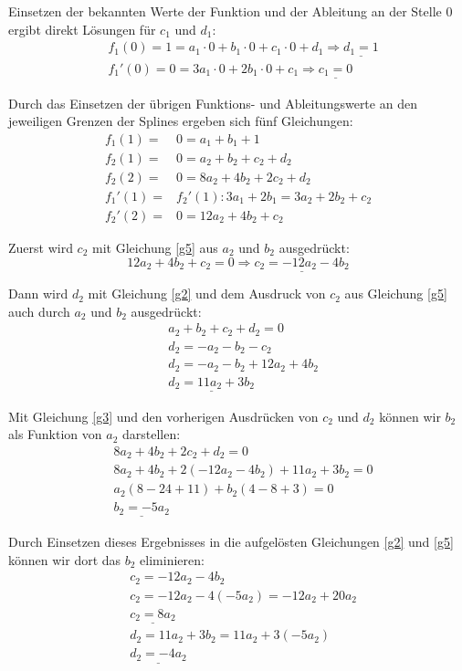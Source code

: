 \documentclass[a4paper,11pt,oneside]{scrartcl}
\begin{document}
Einsetzen der bekannten Werte der Funktion und der Ableitung an der Stelle 0 ergibt direkt Lösungen für $c_1$ und $d_1$:
\begin{align*}
&f_1(0) = 1 = a_1 \cdot 0 + b_1 \cdot 0 + c_1 \cdot 0 + d_1 \Rightarrow \underline{d_1 = 1}\\
&f_1'(0) = 0 = 3a_1 \cdot 0 + 2b_1 \cdot 0 + c_1 \Rightarrow \underline{c_1 = 0}
\end{align*}

Durch das Einsetzen der übrigen Funktions- und Ableitungswerte an den jeweiligen Grenzen der Splines ergeben sich fünf Gleichungen:
\begin{align}
f_1(1) = & 0 = a_1 + b_1 + 1\label{g1}\\
f_2(1) = & 0 = a_2 + b_2 + c_2 + d_2\label{g2}\\
f_2(2) = & 0 = 8a_2 + 4b_2 + 2c_2 + d_2\label{g3}\\
f_1'(1) = & f_2'(1): 3a_1 + 2b_1 = 3a_2 + 2b_2 + c_2\label{g4}\\
f_2'(2) = & 0 = 12a_2 + 4b_2 + c_2\label{g5}
\end{align}

Zuerst wird $c_2$ mit Gleichung \eqref{g5} aus $a_2$ und $b_2$ ausgedrückt:
\begin{equation*}12a_2 + 4b_2 + c_2 = 0 \Rightarrow \underline{c_2 = -12a_2 - 4b_2}\end{equation*}

Dann wird $d_2$ mit Gleichung \eqref{g2} und dem Ausdruck von $c_2$ aus Gleichung \eqref{g5} auch durch $a_2$ und $b_2$ ausgedrückt:
\begin{align*}
&a_2 + b_2 + c_2 + d_2 = 0\\
&d_2 = -a_2 - b_2 - c_2\\
&d_2 = -a_2 - b_2 + 12a_2 +4b_2\\
&\underline{d_2 = 11a_2 + 3b_2}
\end{align*}

Mit Gleichung \eqref{g3} und den vorherigen Ausdrücken von $c_2$ und $d_2$ können wir $b_2$ als Funktion von $a_2$ darstellen:
\begin{align*}
&8a_2 + 4b_2 + 2c_2 + d_2 = 0\\
&8a_2 + 4b_2 + 2(-12a_2 - 4b_2) + 11a_2 + 3b_2 = 0\\
&a_2(8-24+11) + b_2(4-8+3) = 0\\
&\underline{b_2 = -5a_2}
\end{align*}

Durch Einsetzen dieses Ergebnisses in die aufgelösten Gleichungen \eqref{g2} und \eqref{g5} können wir dort das $b_2$ eliminieren:
\begin{align*}
&c_2 = -12a_2 - 4b_2\\
&c_2 = -12a_2 -4(-5a_2) = -12a_2 + 20a_2\\
&\underline{c_2 = 8a_2}\\[.3cm]
&d_2 = 11a_2 + 3b_2 = 11a_2 + 3(-5a_2)\\
&\underline{d_2 = -4a_2}
\end{align*}
\end{document}
